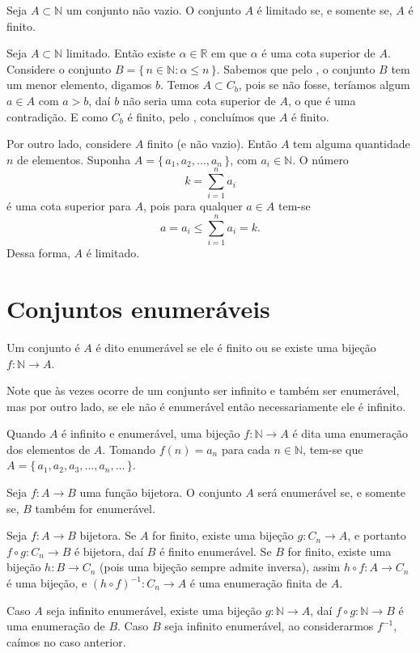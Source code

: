 \documentclass[../main.tex]{subfiles}
\begin{document}
\begin{teo}\label{enum-teo-finitoLimitado}
    Seja $A \subset \mathbb{N}$ um conjunto não vazio. O conjunto $A$ é limitado se, e somente se, $A$ é finito.
\end{teo}
\begin{dem}
    Seja $A \subset \mathbb{N}$ limitado. Então existe $\alpha \in \mathbb{R}$ em que $\alpha$ é uma cota superior de $A$. Considere o conjunto $B = \{\,n \in \mathbb{N} : \alpha \leq n \,\}$.
    Sabemos que pelo , o conjunto $B$ tem um menor elemento, digamos $b$. Temos $A \subset C_b$, pois se não fosse, teríamos algum 
    $a \in A$ com $a > b$, daí $b$ não seria uma cota superior de $A$, o que é uma contradição. E como $C_b$ é finito, pelo , concluímos que $A$ é finito.

    Por outro lado, considere $A$ finito (e não vazio). Então $A$ tem alguma quantidade $n$ de elementos. Suponha $A = \{\,a_1, a_2, ..., a_n\,\}$, com $a_i \in \mathbb{N}$. O número 
    \[ k = \sum_{i=1}^n a_i \]
    é uma cota superior para $A$, pois para qualquer $a \in A$ tem-se 
    \[ a = a_i \leq \sum_{i=1}^n a_i = k. \] 
    Dessa forma, $A$ é limitado.
\end{dem}

\section{Conjuntos enumeráveis}
\begin{defi}\label{enum-def-conjuntoEnumeravel}
    Um conjunto é $A$ é dito enumerável se ele é finito ou se existe uma bijeção $f: \mathbb{N} \to A$.
\end{defi}
Note que às vezes ocorre de um conjunto ser infinito e também ser enumerável, mas por outro lado, se ele não é enumerável então necessariamente ele é infinito.

Quando $A$ é infinito e enumerável, uma bijeção $f \colon \mathbb{N} \to A$ é dita uma enumeração dos elementos de $A$. Tomando $f(n) = a_n$ para cada $n \in \mathbb{N}$, tem-se que $A = \{\,a_1, a_2, a_3, ..., a_n, ...\,\}$.

\begin{prop}
    Seja $f \colon A \to B$ uma função bijetora. O conjunto $A$ será enumerável se, e somente se, $B$ também for enumerável.
\end{prop}
\begin{dem}
    Seja $f \colon A \to B$ bijetora. Se $A$ for finito, existe uma bijeção $g \colon C_n \to A$, e portanto $f \circ g \colon C_n \to B$ é bijetora, daí $B$ é finito enumerável.
    Se $B$ for finito, existe uma bijeção $h \colon B \to C_n$ (pois uma bijeção sempre admite inversa), assim $h \circ f \colon A \to C_n$ é uma bijeção, e $(h \circ f)^{-1} \colon C_n \to A$ é uma enumeração finita de $A$.

    Caso $A$ seja infinito enumerável, existe uma bijeção $g \colon \mathbb{N} \to A$, daí $f \circ g \colon \mathbb{N} \to B$ é uma enumeração de $B$.
    Caso $B$ seja infinito enumerável, ao considerarmos $f^{-1}$, caímos no caso anterior.
\end{dem}
\end{document}
